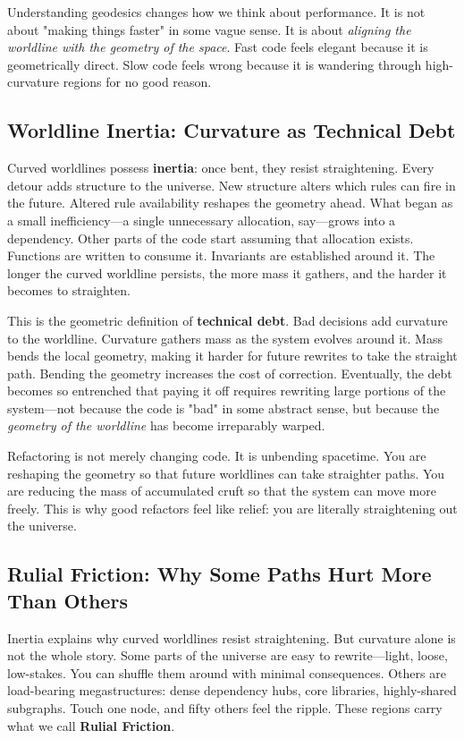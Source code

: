 Understanding geodesics changes how we think about performance. It is not about "making things
faster" in some vague sense. It is about \emph{aligning the worldline with the geometry of the
space}. Fast code feels elegant because it is geometrically direct. Slow code feels wrong because it
is wandering through high-curvature regions for no good reason.

\subsection{Worldline Inertia: Curvature as Technical Debt}

Curved worldlines possess \textbf{inertia}: once bent, they resist straightening. Every detour adds
structure to the universe. New structure alters which rules can fire in the future. Altered rule
availability reshapes the geometry ahead. What began as a small inefficiency—a single unnecessary
allocation, say—grows into a dependency. Other parts of the code start assuming that allocation
exists. Functions are written to consume it. Invariants are established around it. The longer the
curved worldline persists, the more mass it gathers, and the harder it becomes to straighten.

This is the geometric definition of \textbf{technical debt}. Bad decisions add curvature to the
worldline. Curvature gathers mass as the system evolves around it. Mass bends the local geometry,
making it harder for future rewrites to take the straight path. Bending the geometry increases the
cost of correction. Eventually, the debt becomes so entrenched that paying it off requires rewriting
large portions of the system—not because the code is "bad" in some abstract sense, but because the
\emph{geometry of the worldline} has become irreparably warped.

Refactoring is not merely changing code. It is unbending spacetime. You are reshaping the geometry so
that future worldlines can take straighter paths. You are reducing the mass of accumulated cruft so
that the system can move more freely. This is why good refactors feel like relief: you are literally
straightening out the universe.

\subsection{Rulial Friction: Why Some Paths Hurt More Than Others}

Inertia explains why curved worldlines resist straightening. But curvature alone
is not the whole story. Some parts of the universe are easy to rewrite—light,
loose, low-stakes. You can shuffle them around with minimal consequences. Others are load-bearing
megastructures: dense dependency hubs, core libraries, highly-shared subgraphs. Touch one node, and
fifty others feel the ripple. These regions carry what we call \textbf{Rulial Friction}.

